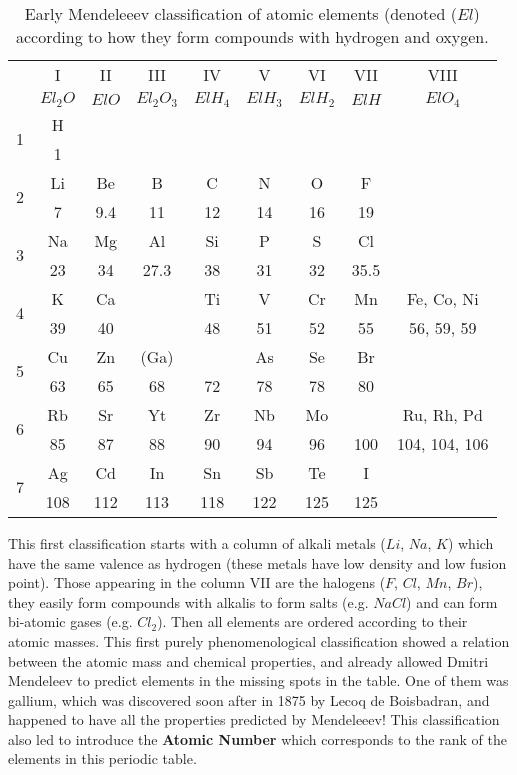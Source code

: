 \begin{table}[]
    \centering
    \begin{tabular}{c|c|c|c|c|c|c|c|c}
     \hline  \hline
        \hspace{0.5 cm} & I & II & III & IV & V & VI & VII & VIII \\
         & $El_2O$ & $El O$ & $El_2 O_3$ & $El H_4$ & $El H_3$ & $El H_2$ & $El H$ & $El O_4$ \\  \hline
         \multirow{2}{*}{1} & H & \multicolumn{6}{c}{}  \\
           & 1 & \multicolumn{6}{c}{} \\     \cline{1-8}
         \multirow{2}{*}{2} & Li & Be & B & C & N & O & F & \\
           & 7 & 9.4 & 11 & 12 & 14 & 16 & 19 & \\  \cline{1-8}
         \multirow{2}{*}{3} & Na & Mg & Al & Si & P & S & Cl & \\
           & 23 & 34 & 27.3 & 38 & 31 & 32 & 35.5 & \\     \hline
         \multirow{2}{*}{4} & K & Ca &  & Ti & V & Cr & Mn & Fe, Co, Ni \\
           & 39 & 40 & & 48 & 51 & 52 & 55 & 56, 59, 59 \\     \hline
         \multirow{2}{*}{5} & Cu & Zn & (Ga) &  & As & Se & Br & \\
           & 63 & 65 & 68 & 72 & 78 & 78 & 80 & \\     \hline
         \multirow{2}{*}{6} & Rb & Sr & Yt & Zr & Nb & Mo & & Ru, Rh, Pd \\
           & 85 & 87 & 88 & 90 & 94 & 96 & 100 & 104, 104, 106 \\    \hline 
         \multirow{2}{*}{7} & Ag & Cd & In & Sn & Sb & Te & I & \\
           & 108 & 112 & 113 & 118 & 122 & 125 & 125 & \\     \hline \hline
    \end{tabular}
    \caption{Early Mendeleeev classification of atomic elements (denoted ($El$) according to how they form compounds with hydrogen and oxygen.}
    \label{tab:FirstPeriodicTable}
\end{table}

This first classification starts with a column of alkali metals ($Li$, $Na$, $K$) which have the same valence as hydrogen (these metals have low density and low fusion point). Those appearing in the column VII are the halogens ($F$, $Cl$, $Mn$, $Br$), they easily form compounds with alkalis to form salts (e.g. $NaCl$) and can form bi-atomic gases (e.g. $Cl_2$). Then all elements are ordered according to their atomic masses. This first purely phenomenological classification showed a relation between the atomic mass and chemical properties, and already allowed Dmitri Mendeleev to predict elements in the missing spots in the table. One of them was gallium, which was discovered soon after in 1875 by Lecoq de Boisbadran, and happened to have all the properties predicted by Mendeleeev! This classification also led to introduce the {\bf Atomic Number} which corresponds to the rank of the elements in this periodic table.

